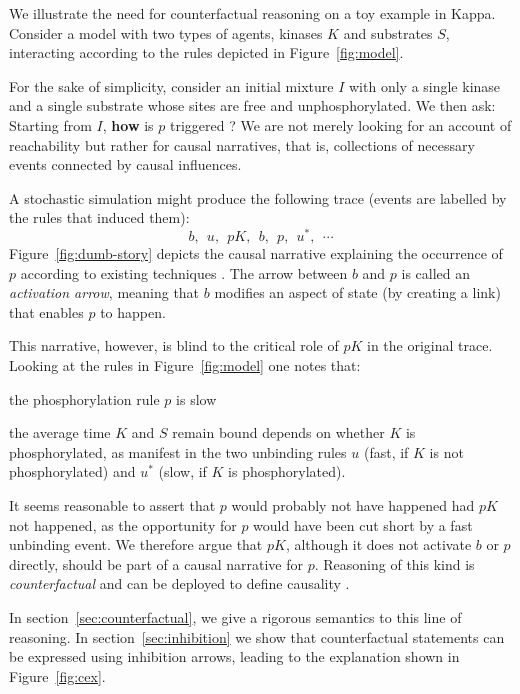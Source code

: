 We illustrate the need for counterfactual reasoning on a toy example in Kappa. Consider a model with two types of agents, kinases $K$ and substrates $S$, interacting according to the rules depicted in Figure~\ref{fig:model}. 



For the sake of simplicity, consider an initial mixture $I$ with only a single kinase and a single substrate whose sites are free and unphosphorylated. We then ask: Starting from $I$, \textbf{how} is $p$ triggered ? We are not merely looking for an account of reachability but rather for causal narratives, that is, collections of necessary events connected by causal influences.

A stochastic simulation \cite{DanosEtAl-APLAS07} might produce 
the following trace (events are labelled by the rules that induced them): 
\[
  b,\ \  u,\ \  pK,\ \  b,\ \  p,\ \  u^{*},\ \  \cdots 
\]
Figure~\ref{fig:dumb-story} depicts the causal narrative explaining the occurrence of $p$ according to existing techniques 
\cite{DBLP:conf/fsttcs/DanosFFHH12,DanosEtAl-CONCUR07}. The arrow between $b$ and $p$ is called an \textit{activation arrow}, meaning that $b$ modifies an aspect of state (by creating a link) that enables $p$ to happen.



This narrative, however, is blind to the critical role of $pK$ in the original trace. Looking at the rules in Figure~\ref{fig:model} one notes that:
\begin{inparaenum}[(i)]
\item the phosphorylation rule $p$ is slow
\item the average time $K$ and $S$ remain bound
depends on whether $K$ is phosphorylated, as manifest
in the two unbinding rules $u$ (fast, if $K$ is not phosphorylated) and $u^{*}$ (slow, if $K$ is phosphorylated).
\end{inparaenum}
It seems reasonable to assert that $p$ would probably not have happened had $pK$ not happened, as the opportunity for $p$ would have been cut short by a fast unbinding event. We therefore argue that $pK$, although it does not activate $b$ or $p$ directly, should be part of a causal narrative for $p$. Reasoning of this kind is \textit{counterfactual} and can be deployed to define causality \cite{lewis1974causation,lewis2000causation}.

In section~\ref{sec:counterfactual}, we give a rigorous semantics to this line of reasoning. In section~\ref{sec:inhibition} we show that counterfactual statements can be expressed using inhibition arrows, leading to the explanation shown in Figure~\ref{fig:cex}.

